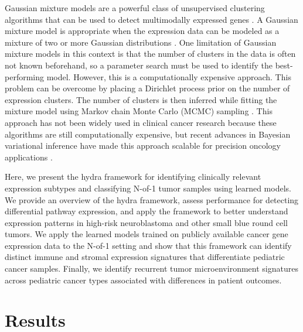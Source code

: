 \documentclass[10pt,letterpaper]{article}
\begin{document}
Gaussian mixture models are a powerful class of unsupervised clustering algorithms that can be used to detect multimodally expressed genes \cite{ghoshMixtureModelsAssessing2004,dahlModelBasedClusteringExpression2006,kimVariableSelectionClustering2006}. A Gaussian mixture model is appropriate when the expression data can be modeled as a mixture of two or more Gaussian distributions \cite{gelmanBayesianDataAnalysis2013}. One limitation of Gaussian mixture models in this context is that the number of clusters in the data is often not known beforehand, so a parameter search must be used to identify the best-performing model. However, this is a computationally expensive approach. This problem can be overcome by placing a Dirichlet process prior on the number of expression clusters. The number of clusters is then inferred while fitting the mixture model using Markov chain Monte Carlo (MCMC) sampling \cite{gelmanBayesianDataAnalysis2013}. This approach has not been widely used in clinical cancer research because these algorithms are still computationally expensive, but recent advances in Bayesian variational inference have made this approach scalable for precision oncology applications \cite{thallBayesianNonparametricStatistics2017}.

Here, we present the hydra framework for identifying clinically relevant expression subtypes and classifying N-of-1 tumor samples using learned models. We provide an overview of the hydra framework, assess performance for detecting differential pathway expression, and apply the framework to better understand expression patterns in high-risk neuroblastoma and other small blue round cell tumors. We apply the learned models trained on publicly available cancer gene expression data to the N-of-1 setting and show that this framework can identify distinct immune and stromal expression signatures that differentiate pediatric cancer samples. Finally, we identify recurrent tumor microenvironment signatures across pediatric cancer types associated with differences in patient outcomes.

\section*{Results}
\end{document}
